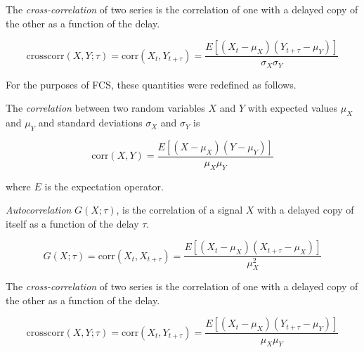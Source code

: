 \documentclass[12pt,]{book}
\theoremstyle{definition}
\theoremstyle{definition}
\theoremstyle{definition}
\theoremstyle{remark}
\let\BeginKnitrBlock\begin \let\EndKnitrBlock\end
\begin{document}
\BeginKnitrBlock{definition}[statistics]
\protect\hypertarget{def:unnamed-chunk-20}{}{\label{def:unnamed-chunk-20}
\iffalse (statistics) \fi{} }The \emph{cross-correlation} of two series
is the correlation of one with a delayed copy of the other as a function
of the delay.

\begin{equation}
\text{crosscorr}(X, Y; \tau) = \text{corr}(X_t, Y_{t + \tau}) = \frac{E[(X_t - \mu_X)(Y_{t + \tau} - \mu_Y)]}{\sigma_X \sigma_Y}
\label{eq:crosscorrelation}
\end{equation}
\EndKnitrBlock{definition}

For the purposes of FCS, these quantities were redefined as follows.

\BeginKnitrBlock{definition}[FCS]
\protect\hypertarget{def:unnamed-chunk-21}{}{\label{def:unnamed-chunk-21}
\iffalse (FCS) \fi{} }The \emph{correlation} between two random
variables \(X\) and \(Y\) with expected values \(\mu_X\) and \(\mu_Y\)
and standard deviations \(\sigma_X\) and \(\sigma_Y\) is

\begin{equation}
\text{corr}(X, Y) = \frac{E[(X - \mu_X)(Y - \mu_Y)]}{\mu_X \mu_Y}
\label{eq:FCScorrelation}
\end{equation}

where \(E\) is the expectation operator.
\EndKnitrBlock{definition}

\BeginKnitrBlock{definition}[FCS]
\protect\hypertarget{def:unnamed-chunk-22}{}{\label{def:unnamed-chunk-22}
\iffalse (FCS) \fi{} }\emph{Autocorrelation} \(G(X; \tau)\), is the
correlation of a signal \(X\) with a delayed copy of itself as a
function of the delay \(\tau\).

\begin{equation}
G(X; \tau) = \text{corr}(X_t, X_{t + \tau}) = \frac{E[(X_t - \mu_X)(X_{t + \tau} - \mu_X)]}{\mu^2_X}
\label{eq:FCSautocorrelation}
\end{equation}
\EndKnitrBlock{definition}

\BeginKnitrBlock{definition}[FCS]
\protect\hypertarget{def:unnamed-chunk-23}{}{\label{def:unnamed-chunk-23}
\iffalse (FCS) \fi{} }The \emph{cross-correlation} of two series is the
correlation of one with a delayed copy of the other as a function of the
delay.

\begin{equation}
\text{crosscorr}(X, Y; \tau) = \text{corr}(X_t, Y_{t + \tau}) = \frac{E[(X_t - \mu_X)(Y_{t + \tau} - \mu_Y)]}{\mu_X \mu_Y}
\label{eq:FCScrosscorrelation}
\end{equation}
\EndKnitrBlock{definition}
\end{document}
